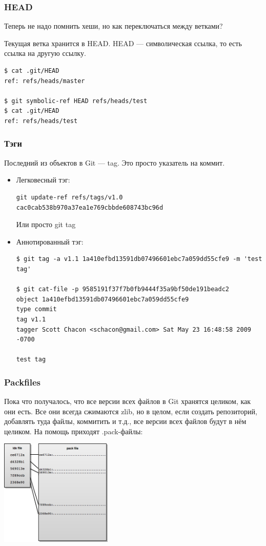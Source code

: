 \documentclass[xetex,mathserif,serif]{beamer}
\begin{document}
	\begin{frame}[fragile]
		\frametitle{HEAD}
		Теперь не надо помнить хеши, но как переключаться между ветками?

		Текущая ветка хранится в HEAD. HEAD --- символическая ссылка, то есть ссылка на другую ссылку.
		\begin{verbatim}
$ cat .git/HEAD
ref: refs/heads/master

$ git symbolic-ref HEAD refs/heads/test
$ cat .git/HEAD
ref: refs/heads/test
		\end{verbatim}
	\end{frame}

	\begin{frame}[fragile]
		\frametitle{Тэги}
		Последний из объектов в Git --- tag. Это просто указатель на коммит.
		\begin{footnotesize}
			\begin{itemize}
				\item Легковесный тэг:
					\begin{verbatim}
git update-ref refs/tags/v1.0 cac0cab538b970a37ea1e769cbbde608743bc96d
					\end{verbatim}
					Или просто git tag
				\item Аннотированный тэг:
					\begin{verbatim}
$ git tag -a v1.1 1a410efbd13591db07496601ebc7a059dd55cfe9 -m 'test tag'

$ git cat-file -p 9585191f37f7b0fb9444f35a9bf50de191beadc2
object 1a410efbd13591db07496601ebc7a059dd55cfe9
type commit
tag v1.1
tagger Scott Chacon <schacon@gmail.com> Sat May 23 16:48:58 2009 -0700

test tag
					\end{verbatim}
			\end{itemize}
		\end{footnotesize}
	\end{frame}

	\begin{frame}[fragile]
		\frametitle{Packfiles}
		Пока что получалось, что все версии всех файлов в Git хранятся целиком, как они есть. Все они всегда сжимаются zlib, но в целом, если создать репозиторий, добавлять туда файлы, коммитить и т.д., все версии всех файлов будут в нём целиком. На помощь приходят .pack-файлы:
		\begin{center}
			\includegraphics[width=0.4\textwidth]{gitPackFiles.png}
		\end{center}
	\end{frame}
\end{document}
